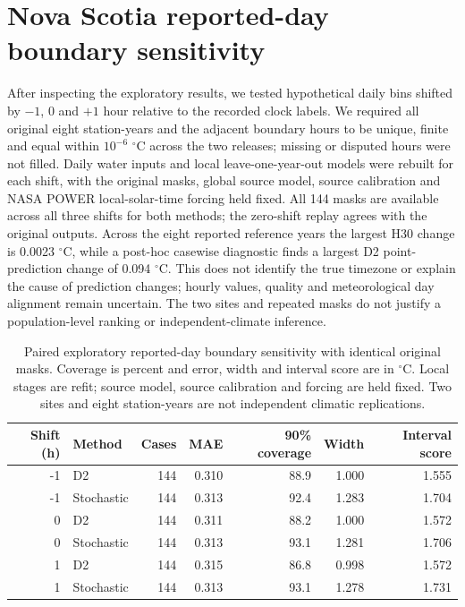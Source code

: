 \section{Nova Scotia reported-day boundary sensitivity}
After inspecting the exploratory results, we tested hypothetical daily bins shifted by $-1$, 0 and $+1$ hour relative to the recorded clock labels. We required all original eight station-years and the adjacent boundary hours to be unique, finite and equal within $10^{-6}$ $^{\circ}$C across the two releases; missing or disputed hours were not filled. Daily water inputs and local leave-one-year-out models were rebuilt for each shift, with the original masks, global source model, source calibration and NASA POWER local-solar-time forcing held fixed. All 144 masks are available across all three shifts for both methods; the zero-shift replay agrees with the original outputs. Across the eight reported reference years the largest H30 change is 0.0023 $^{\circ}$C, while a post-hoc casewise diagnostic finds a largest D2 point-prediction change of 0.094 $^{\circ}$C. This does not identify the true timezone or explain the cause of prediction changes; hourly values, quality and meteorological day alignment remain uncertain. The two sites and repeated masks do not justify a population-level ranking or independent-climate inference.
\begin{table}[p]\centering\small
\caption{Paired exploratory reported-day boundary sensitivity with identical original masks. Coverage is percent and error, width and interval score are in $^{\circ}$C. Local stages are refit; source model, source calibration and forcing are held fixed. Two sites and eight station-years are not independent climatic replications.}\label{tab:ns-clock-sensitivity}
\begin{tabular}{rlrrrrr}\toprule
Shift (h) & Method & Cases & MAE & 90\% coverage & Width & Interval score\\\midrule
-1 & D2 & 144 & 0.310 & 88.9 & 1.000 & 1.555\\
-1 & Stochastic & 144 & 0.313 & 92.4 & 1.283 & 1.704\\
0 & D2 & 144 & 0.311 & 88.2 & 1.000 & 1.572\\
0 & Stochastic & 144 & 0.313 & 93.1 & 1.281 & 1.706\\
1 & D2 & 144 & 0.315 & 86.8 & 0.998 & 1.572\\
1 & Stochastic & 144 & 0.313 & 93.1 & 1.278 & 1.731\\
\bottomrule\end{tabular}
\end{table}
